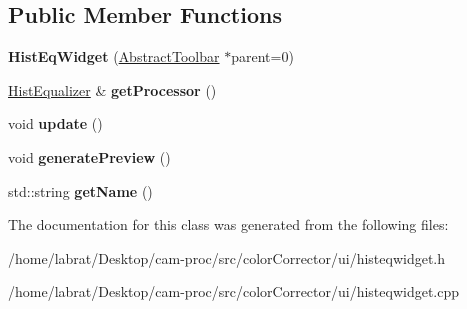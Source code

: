 \subsection*{Public Member Functions}
\begin{DoxyCompactItemize}
\item 
{\bfseries Hist\+Eq\+Widget} (\hyperlink{classAbstractToolbar}{Abstract\+Toolbar} $\ast$parent=0)\hypertarget{classHistEqWidget_ae317f920e5f91a03416bba6c49f0c007}{}\label{classHistEqWidget_ae317f920e5f91a03416bba6c49f0c007}

\item 
\hyperlink{classHistEqualizer}{Hist\+Equalizer} \& {\bfseries get\+Processor} ()\hypertarget{classHistEqWidget_a6bfdd913cab30f0e38fdd31bd2c236df}{}\label{classHistEqWidget_a6bfdd913cab30f0e38fdd31bd2c236df}

\item 
void {\bfseries update} ()\hypertarget{classHistEqWidget_a4e638f807b015ff30d7f861093cda2b3}{}\label{classHistEqWidget_a4e638f807b015ff30d7f861093cda2b3}

\item 
void {\bfseries generate\+Preview} ()\hypertarget{classHistEqWidget_a3ca663bde2818e3249344e77c9517971}{}\label{classHistEqWidget_a3ca663bde2818e3249344e77c9517971}

\item 
std\+::string {\bfseries get\+Name} ()\hypertarget{classHistEqWidget_ae7a2b0b3ff48971b844b637ee9a1e7e9}{}\label{classHistEqWidget_ae7a2b0b3ff48971b844b637ee9a1e7e9}

\end{DoxyCompactItemize}


The documentation for this class was generated from the following files\+:\begin{DoxyCompactItemize}
\item 
/home/labrat/\+Desktop/cam-\/proc/src/color\+Corrector/ui/histeqwidget.\+h\item 
/home/labrat/\+Desktop/cam-\/proc/src/color\+Corrector/ui/histeqwidget.\+cpp\end{DoxyCompactItemize}
